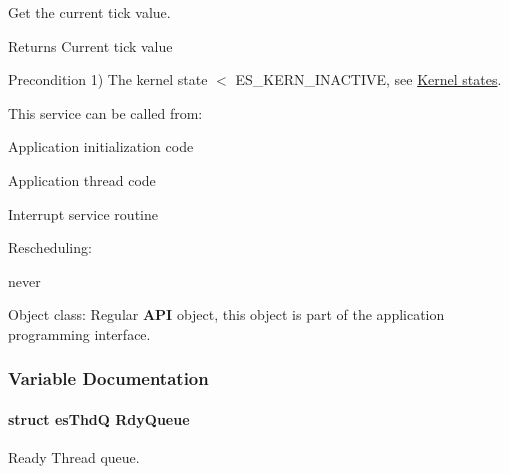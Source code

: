 Get the current tick value. 

\begin{DoxyReturn}{Returns}
Current tick value 
\end{DoxyReturn}
\begin{DoxyPrecond}{Precondition}
1) {\ttfamily The kernel state $<$ E\-S\-\_\-\-K\-E\-R\-N\-\_\-\-I\-N\-A\-C\-T\-I\-V\-E}, see \hyperlink{states}{Kernel states}. 
\end{DoxyPrecond}
\begin{DoxyParagraph}{This service can be called from\-:}

\begin{DoxyItemize}
\item Application initialization code
\item Application thread code
\item Interrupt service routine 
\end{DoxyItemize}
\end{DoxyParagraph}
\begin{DoxyParagraph}{Rescheduling\-:}

\begin{DoxyItemize}
\item never 
\end{DoxyItemize}
\end{DoxyParagraph}
\begin{DoxyParagraph}{Object class\-:}
Regular {\bfseries A\-P\-I} object, this object is part of the application programming interface. 
\end{DoxyParagraph}


\subsubsection{Variable Documentation}
\hypertarget{group__kern__impl_gafa3f26429f0f60e0d50eb119de1c8f49}{
\paragraph[{Rdy\-Queue}]{\setlength{\rightskip}{0pt plus 5cm}struct {\bf es\-Thd\-Q} Rdy\-Queue\hspace{0.3cm}{\ttfamily [static]}}}\label{group__kern__impl_gafa3f26429f0f60e0d50eb119de1c8f49}


Ready Thread queue. 

